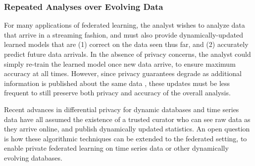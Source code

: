 \subsubsection{Repeated Analyses over Evolving Data}
\label{sssec:repeated_analyses}

For many applications of federated learning, the analyst wishes to analyze data that arrive in a streaming fashion, and must also provide dynamically-updated learned models that are (1) correct on the data seen thus far, and (2) accurately predict future data arrivals.  In the absence of privacy concerns, the analyst could simply re-train the learned model once new data arrive, to ensure maximum accuracy at all times.  However, since privacy guarantees degrade as additional information is published about the same data \cite{DMNS06,DRV10}, these updates must be less frequent to still preserve both privacy and accuracy of the overall analysis.

Recent advances in differential privacy for dynamic databases and time series data \cite{CKM+18,CKLT18, CKM+18b} have all assumed the existence of a trusted curator who can see raw data as they arrive online, and publish dynamically updated statistics.  An open question is how these algorithmic techniques can be extended to the federated setting, to enable private federated learning on time series data or other dynamically evolving databases.

